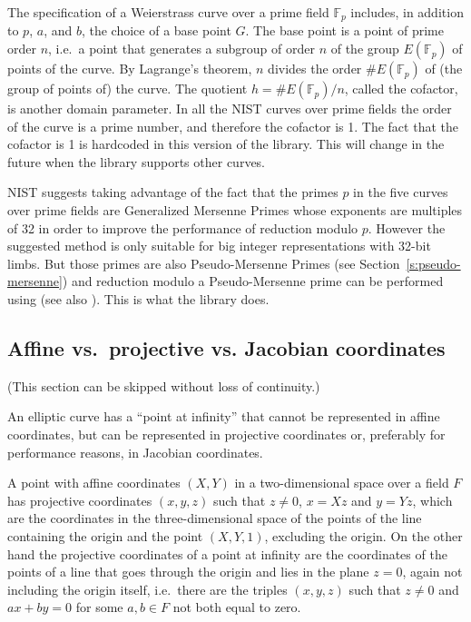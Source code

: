 \documentclass[12pt]{article}
\begin{document}
The specification of a Weierstrass curve over a prime
field $\mathbb{F}_p$ includes, in addition to $p$, $a$, and $b$, the
choice of a base point $G$.  The base point is a point of prime order
$n$, i.e.\ a point that generates a subgroup of order $n$ of the group
$E(\mathbb{F}_p)$ of points of the curve.  By Lagrange's theorem, $n$
divides the order $\#E(\mathbb{F}_p)$ of (the group of points of) the
curve.  The quotient $h = \#E(\mathbb{F}_p) / n$, called the cofactor,
is another domain parameter.  In all the NIST curves over prime fields
the order of the curve is a prime number, and therefore the cofactor
is 1.  The fact that the cofactor is 1 is hardcoded in this version of the library.
This will change in the future when the library supports other curves.

NIST \cite[\S~D.2]{DSS-4} suggests taking advantage of the fact that
the primes $p$ in the five curves over prime fields are Generalized
Mersenne Primes whose exponents are multiples of 32 in order to
improve the performance of reduction modulo $p$.  However the
suggested method is only suitable for big integer representations with
32-bit limbs.  But those primes are also Pseudo-Mersenne Primes 
(see Section~\ref{s:pseudo-mersenne}) and
reduction modulo a Pseudo-Mersenne prime can be performed using
\cite[Algorithm 14.47]{Menezes97handbookof} 
(see also \cite[Algorithm~3]{Taschwer2001}).  This is what the library
does.

\subsection{Affine vs.\ projective vs. Jacobian coordinates}

(This section can be skipped without loss of continuity.)

An elliptic curve has a ``point at infinity'' that cannot be
represented in affine coordinates, but can be represented in
projective coordinates or, preferably for performance reasons, in
Jacobian coordinates.

A point with affine coordinates $(X,Y)$ in a two-dimensional space over a field $F$ has projective
coordinates $(x,y,z)$ such that $z\not=0$, $x=Xz$ and $y=Yz$, which are
the coordinates in the three-dimensional space of the points of the
line containing the origin and the point $(X,Y,1)$, excluding the
origin.  On the other hand the projective coordinates of a point at
infinity are the coordinates of the points of a line that goes through
the origin and lies in the plane $z=0$, again not including the origin
itself, i.e.\ there are the triples $(x,y,z)$ such that $z\not=0$ and
$ax+by=0$ for some $a,b\in F$ not both equal to zero.
\end{document}
